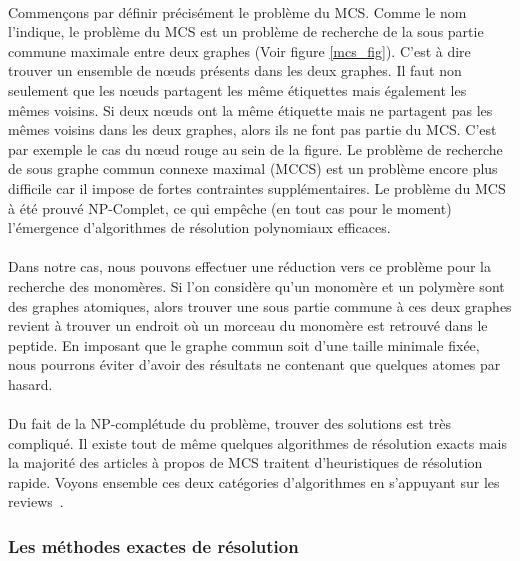 \documentclass[12pt,french,twoside]{report}
\begin{document}
\paragraph{}Commençons par définir précisément le problème du MCS.
Comme le nom l'indique, le problème du MCS est un problème de recherche de la sous partie commune maximale entre deux graphes (Voir figure \ref{mcs_fig}).
C'est à dire trouver un ensemble de n\oe{}uds présents dans les deux graphes.
Il faut non seulement que les n\oe{}uds partagent les même étiquettes mais également les mêmes voisins.
Si deux n\oe{}uds ont la même étiquette mais ne partagent pas les mêmes voisins dans les deux graphes, alors ils ne font pas partie du MCS.
C'est par exemple le cas du n\oe{}ud rouge au sein de la figure.
Le problème de recherche de sous graphe commun connexe maximal (MCCS) est un problème encore plus difficile car il impose de fortes contraintes supplémentaires.
Le problème du MCS à été prouvé NP-Complet\cite{garey_computers_1979}, ce qui empêche (en tout cas pour le moment) l'émergence d'algorithmes de résolution polynomiaux efficaces.

\paragraph{}Dans notre cas, nous pouvons effectuer une réduction vers ce problème pour la recherche des monomères.
Si l'on considère qu'un monomère et un polymère sont des graphes atomiques, alors trouver une sous partie commune à ces deux graphes revient à trouver un endroit où un morceau du monomère est retrouvé dans le peptide.
En imposant que le graphe commun soit d'une taille minimale fixée, nous pourrons éviter d'avoir des résultats ne contenant que quelques atomes par hasard.

\paragraph{}Du fait de la NP-complétude du problème, trouver des solutions est très compliqué.
Il existe tout de même quelques algorithmes de résolution exacts mais la majorité des articles à propos de MCS traitent d'heuristiques de résolution rapide.
Voyons ensemble ces deux catégories d'algorithmes en s'appuyant sur les reviews~\cite{raymond_maximum_2002, ehrlich_maximum_2011}.


\subsubsection{Les méthodes exactes de résolution}
\end{document}
